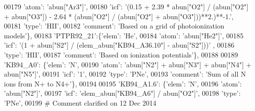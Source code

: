 \begin{DoxyCode}
00179                                        \textcolor{stringliteral}{'atom'}: \textcolor{stringliteral}{'abun["Ar3"]'},
00180                                        \textcolor{stringliteral}{'icf'}: \textcolor{stringliteral}{'(0.15 + 2.39 * abun["O2"] / (abun["O2"] + abun["O3"]) - 2.64
       * (abun["O2"] / (abun["O2"] + abun["O3"]))**2.)**-1.'},
00181                                        \textcolor{stringliteral}{'type'}: \textcolor{stringliteral}{'HII'},   
00182                                        \textcolor{stringliteral}{'comment'}: \textcolor{stringliteral}{'Based on a grid of photoionization models'}\},
00183                          \textcolor{stringliteral}{'PTPR92\_21'}:\{\textcolor{stringliteral}{'elem'}: \textcolor{stringliteral}{'He'},
00184                                        \textcolor{stringliteral}{'atom'}: \textcolor{stringliteral}{'abun["He2"]'},
00185                                        \textcolor{stringliteral}{'icf'}: \textcolor{stringliteral}{'(1 + abun["S2"] / (elem\_abun["KB94\_A36.10"] -  abun["S2"]))'}
      ,
00186                                        \textcolor{stringliteral}{'type'}: \textcolor{stringliteral}{'HII'},
00187                                        \textcolor{stringliteral}{'comment'}: \textcolor{stringliteral}{'Based on ionization potentials'}\},
00188                          
00189                          \textcolor{stringliteral}{'KB94\_A0'}: \{\textcolor{stringliteral}{'elem'}: \textcolor{stringliteral}{'N'},
00190                                     \textcolor{stringliteral}{'atom'}: \textcolor{stringliteral}{'abun["N2"] + abun["N3"] + abun["N4"] + abun["N5"]'},
00191                                     \textcolor{stringliteral}{'icf'}: \textcolor{stringliteral}{'1'},
00192                                      \textcolor{stringliteral}{'type'}: \textcolor{stringliteral}{'PNe'},
00193                                      \textcolor{stringliteral}{'comment'}: \textcolor{stringliteral}{'Sum of all N ions from N+ to N4+'}\},
00194                          
00195                          \textcolor{stringliteral}{'KB94\_A1.6'}: \{\textcolor{stringliteral}{'elem'}: \textcolor{stringliteral}{'N'},
00196                                      \textcolor{stringliteral}{'atom'}: \textcolor{stringliteral}{'abun["N2"]'},
00197                                      \textcolor{stringliteral}{'icf'}: \textcolor{stringliteral}{'elem\_abun["KB94\_A6"]  / abun["O2"]'},
00198                                      \textcolor{stringliteral}{'type'}: \textcolor{stringliteral}{'PNe'},
00199 \textcolor{comment}{# Comment clarified on 12 Dec 2014 }

\end{DoxyCode}
